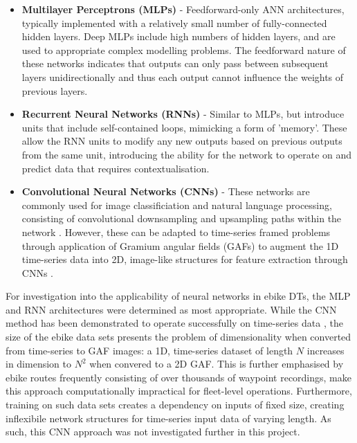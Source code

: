\documentclass[a4paper, 10pt]{article}
\numberwithin{equation}{section}
\begin{document}
\begin{itemize}
    \item \textbf{Multilayer Perceptrons (MLPs)} - Feedforward-only ANN architectures, typically implemented with a relatively small number of fully-connected hidden layers. Deep MLPs include high numbers of hidden layers, and are used to appropriate complex modelling problems. The feedforward nature of these networks indicates that outputs can only pass between subsequent layers unidirectionally and thus each output cannot influence the weights of previous layers.
    
    \item \textbf{Recurrent Neural Networks (RNNs)} - Similar to MLPs, but introduce units that include self-contained loops, mimicking a form of 'memory'. These allow the RNN units to modify any new outputs based on previous outputs from the same unit, introducing the ability for the network to operate on and predict data that requires contextualisation.
    
    \item \textbf{Convolutional Neural Networks (CNNs)} - These networks are commonly used for image classificiation and natural language processing, consisting of convolutional downsampling and upsampling paths within the network \cite{nn:u_net}. However, these can be adapted to time-series framed problems through application of Gramium angular fields (GAFs) to augment the 1D time-series data into 2D, image-like structures for feature extraction through CNNs \cite{nn:gaf}.
\end{itemize}

For investigation into the applicability of neural networks in ebike DTs, the MLP and RNN architectures were determined as most appropriate. While the CNN method has been demonstrated to operate successfully on time-series data \cite{nn:gaf}, the size of the ebike data sets presents the problem of dimensionality when converted from time-series to GAF images: a 1D, time-series dataset of length $N$ increases in dimension to $N^2$ when convered to a 2D GAF. This is further emphasised by ebike routes frequently consisting of over thousands of waypoint recordings, make this approach computationally impractical for fleet-level operations. Furthermore, training on such data sets creates a dependency on inputs of fixed size, creating inflexibile network structures for time-series input data of varying length. As such, this CNN approach was not investigated further in this project.
\end{document}
